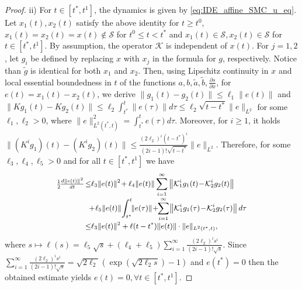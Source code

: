 \documentclass{article}
\begin{document}
\begin{proof}
	ii) For $t\in[t^*,t^1]$, 
	  the dynamics  is given by \eqref{eq:IDE_affine_SMC_u_eq}.
	Let $x_1(t), x_2(t)$ satisfy the above identity for $t\geq t^0$, $x_1(t)=x_2(t)=x(t)\notin \mathcal{S}$ for $t^0\leq t< t^*$ and $x_1(t)\in \mathcal{S}, x_{2}(t)\in \mathcal{S}$ for $t\in [t^*,t^1]$. 
	By assumption, the operator $\mathcal{K}$ is independent of $x(t)$.
For $j=1,2$, let $g_i$ be defined by replacing $x$ with  $x_j$ in the formula for $g$, respectively. Notice than $\tilde g$ is identical for both $x_1$ and $x_2$.
	Then, using Lipschitz continuity  in $x$ and local essential boundedness in $t$ of the functions  $a,b,\tilde a,\tilde b, \frac{\partial s}{\partial x}$,  for $e(t)=x_1(t)-x_2(t)$, we derive
	$
	\|g_1(t)-g_2(t)\|\leq \ell_1 \|e(t)\|
	$
	and 
	$
	\|Kg_1(t)-Kg_2(t)\|\leq \ell_2\int^t_{t^*}\|e(\tau)\| d\tau\leq \ell_2\sqrt{t-t^*}\|e\|_{L^2}
	$
	for some $\ell_1, \ell_2\!>\!0$, where $\|e\|^2_{L^2(t^*,t)}=\int^t_{t^*} e(\tau) d\tau$. Moreover, for $i\geq 1$, it holds
	$
	\|(K^ig_1)(t)-(K^ig_2)(t)\|\leq \tfrac{(2\ell_2)^i(t-t^*)^{i}}{(2i-1)!\sqrt{t-t^*}}\|e\|_{L^2}.$	
Therefore, for some $\ell_3,\ell_4,\ell_5\!>\!0$ and for all $t\!\in\! [t^*,t^1]$ we have \vspace{-3mm}
	\[\vspace{-1mm}\small
\begin{split}
	\tfrac{1}{2}\!\tfrac{d \|e(t)\|^2}{dt}\!\leq&\ell_3\|e(t)\|^2\!+\ell_4\|e(t)\|\sum_{i=1}^{\infty} \left\|\mathcal{K}^i_1g_1(t)\!-\!\mathcal{K}^i_2g_2(t) \right\|\\[-1mm]
	&\!\!\!+\!\ell_5 \|e(t)\|\!\int^t_{t^*}\!\! \|e(\tau)\|\!+ \!\!\sum_{i=1}^{\infty}\! \left\|\mathcal{K}^i_1g_1(\tau)\!-\!\mathcal{K}^i_2g_2(\tau) \right\| d\tau\\[-1mm]
	\leq& \ell_3\|e(t)\|^2+ \ell(t-t^*)\|e(t)\| \cdot \|e\|_{L^2(t^*,t)},\\
\end{split}
\]
where $s\mapsto \ell(s)\!=\!\ell_5\sqrt{s}\!+\!(\ell_4\!+\!\ell_5)
\sum_{i=1}^{\infty}\tfrac{(2\ell_2)^is^{i}}{(2i-1)!\sqrt{s}}$.
Since   $\sum_{i=1}^{\infty}\tfrac{(2\ell_2)^is^{i}}{(2i-1)!\sqrt{s}}=\sqrt{2\ell_2}(\exp(\sqrt{2\ell_2 s})-1)$  and $e(t^*)=0$ then the obtained estimate yields $e(t)\!=\!0,\forall t\in [t^*,t^1]$.
	\end{proof}
\end{document}
